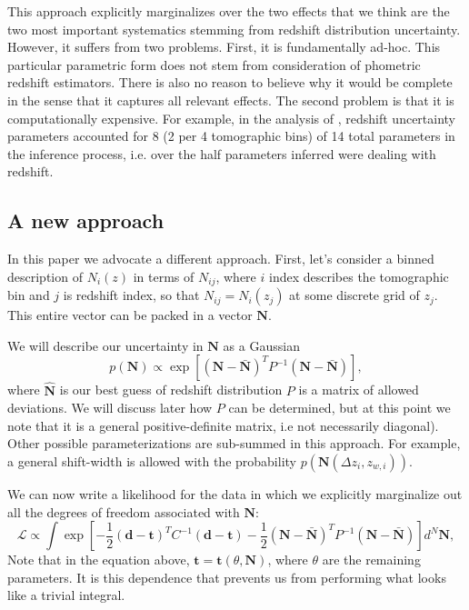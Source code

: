 \documentclass[a4paper,11pt]{article}
\newcommand{\vd}{\mathbf{d}}
\newcommand{\vt}{\mathbf{t}}
\newcommand{\vN}{\mathbf{N}}
\begin{document}
This approach explicitly marginalizes over the two effects that we think are the two most important systematics stemming from redshift distribution uncertainty. However, it suffers from two problems. First, it is fundamentally ad-hoc. This particular parametric form does not stem from consideration of phometric redshift estimators. There is also no reason to believe why it would be complete in the sense that it captures all relevant effects. The second problem is that it is computationally expensive. For example, in the analysis 
    of \cite{1912.08209}, redshift uncertainty parameters accounted for 8 (2 per 4 tomographic bins) of 14 total parameters in the inference process, i.e. over the half parameters inferred were dealing with redshift.

\subsection{A new approach}
    
In this paper we advocate a different approach. First, let's consider a binned description of $N_i(z)$ in terms of $N_{ij}$, where $i$ index describes the tomographic bin and $j$ is redshift index, so that $N_{ij} = N_i(z_j)$ at some discrete grid of $z_j$. This entire vector can be packed in a vector $\vN$.

We will describe our uncertainty in $\vN$ as a Gaussian
\begin{equation}
  p(\vN) \propto \exp\left[  (\vN - \bar{\vN})^T P^{-1} (\vN -\bar{\vN}) \right],
\end{equation}
where $\hat{\vN}$ is our best guess of redshift distribution $P$ is a matrix of allowed deviations. We will discuss later how $P$ can be determined, but at this point we note that it is a general positive-definite matrix, i.e not necessarily diagonal). Other possible parameterizations are sub-summed in this approach. For example, a general shift-width is allowed with the probability $p(\vN(\Delta z_i, z_{w,i}))$.

We can now write a likelihood for the data in which we explicitly marginalize out all the degrees of freedom associated with $\vN$:
\begin{equation}
\mathcal{L} \propto  \int \exp\left [-\frac{1}{2} (\vd-\vt)^T C^{-1} (\vd-\vt) -\frac{1}{2} (\vN - \bar{\vN})^T P^{-1} (\vN -\bar{\vN}) \right]  d^N\vN, \label{eq:like2}
  \end{equation}
  Note that in the equation above, $\vt=\vt(\theta,\vN)$, where $\theta$ are the remaining parameters. It is this dependence that prevents us from performing what looks like a trivial integral.
\end{document}
